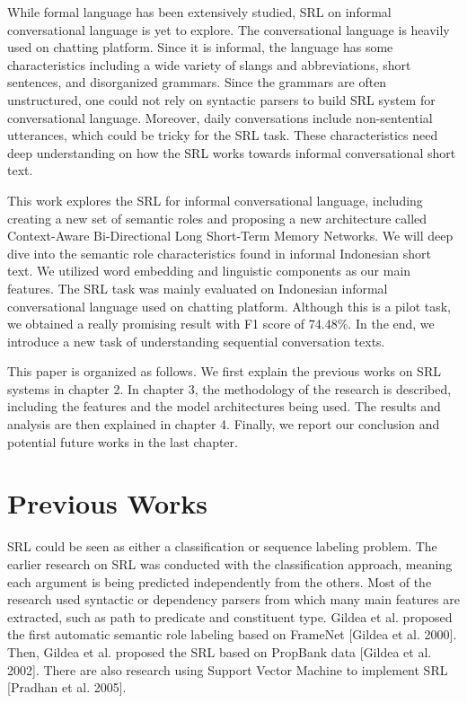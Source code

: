 While formal language has been extensively studied, SRL on informal conversational language is yet to explore. The conversational language is heavily used on chatting platform. Since it is informal, the language has some characteristics including a wide variety of slangs and abbreviations, short sentences, and disorganized grammars. Since the grammars are often unstructured, one could not rely on syntactic parsers to build SRL system for conversational language. Moreover, daily conversations include non-sentential utterances, which could be tricky for the SRL task. These characteristics need deep understanding on how the SRL works towards informal conversational short text.

This work explores the SRL for informal conversational language, including creating a new set of semantic roles and proposing a new architecture called Context-Aware Bi-Directional Long Short-Term Memory Networks. We will deep dive into the semantic role characteristics found in informal Indonesian short text. We utilized word embedding and linguistic components as our main features. The SRL task was mainly evaluated on Indonesian informal conversational language used on chatting platform. Although this is a pilot task, we obtained a really promising result with F1 score of 74.48\%. In the end, we introduce a new task of understanding sequential conversation texts.

This paper is organized as follows. We first explain the previous works on SRL systems in chapter 2. In chapter 3, the methodology of the research is described, including the features and the model architectures being used. The results and analysis are then explained in chapter 4. Finally, we report our conclusion and potential future works in the last chapter.


\section{Previous Works}
SRL could be seen as either a classification or sequence labeling problem. The earlier research on SRL was conducted with the classification approach, meaning each argument is being predicted independently from the others. Most of the research used syntactic or dependency parsers from which many main features are extracted, such as path to predicate and constituent type. Gildea et al. proposed the first automatic semantic role labeling based on FrameNet [Gildea et al. 2000]. Then, Gildea et al. proposed the SRL based on PropBank data [Gildea et al. 2002]. There are also research using Support Vector Machine to implement SRL [Pradhan et al. 2005].

